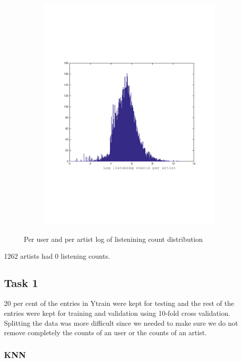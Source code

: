 \begin{figure}[h]
\begin{subfigure}[b]{0.45\textwidth}
    \includegraphics[width=\textwidth]{figures/histCountPerArtist.pdf}
    \caption{}
  \end{subfigure}
  \caption{Per user and per artist log of listenining count distribution}
  \label{fig:user_artist_distribution}
\end{figure}
1262 artists had 0 listening counts.

 
\subsection{Task 1}
20 per cent of the entries in Ytrain were kept for testing and the rest of the entries
were kept for training and validation using 10-fold cross validation.
Splitting the data was  more difficult since we needed to make sure we do not
remove completely the counts of an user or the counts of an artist.
\subsubsection{KNN}
